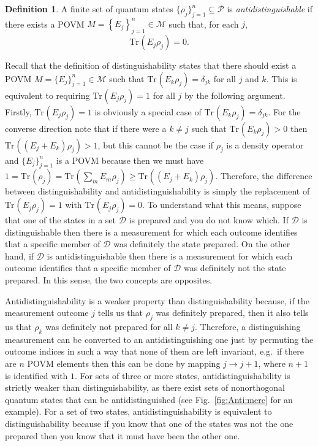 \documentclass[DIV=calc,fontsize=12pt]{scrartcl} %
\theoremstyle{definition}
\newtheorem{definition}{Definition}[section]
\theoremstyle{plain}
\newcommand{\Tr}[2][]{\ensuremath{\text{Tr}_{#1} \left ( #2 \right )}}
\begin{document}
\begin{definition}
A finite set of quantum states $\{\rho_j\}_{j=1}^n \subseteq
\mathcal{P}$ is \emph{antidistinguishable} if there exists a POVM $M
= \left \{ E_j \right \}_{j=1}^n \in \mathcal{M}$ such that, for
each $j$,
\begin{equation}
\Tr{E_j \rho_j} = 0.
\end{equation}
\end{definition}

Recall that the definition of distinguishability states that there
should exist a POVM $M = \{E_j\}_{j=1}^n \in \mathcal{M}$ such that
$\Tr{E_k\rho_j} = \delta_{jk}$ for all $j$ and $k$.  This is
equivalent to requiring $\Tr{E_j \rho_j} = 1$ for all $j$ by the
following argument.  Firstly, $\Tr{E_j\rho_j} = 1$ is obviously a
special case of $\Tr{E_k \rho_j} = \delta_{jk}$.  For the converse
direction note that if there were a $k \neq j$ such that $\Tr{E_k
\rho_j} > 0$ then $\Tr{\left ( E_j + E_k \right ) \rho_j} > 1$, but
this cannot be the case if $\rho_j$ is a density operator and
$\{E_j\}_{j=1}^n$ is a POVM because then we must have $1 = \Tr{\rho_j}
= \Tr{\sum_m E_m \rho_j} \geq \Tr{\left ( E_j + E_k \right ) \rho_j}$.
Therefore, the difference between distinguishability and
antidistinguishability is simply the replacement of $\Tr{E_j \rho_j} =
1$ with $\Tr{E_j \rho_j} = 0$.  To understand what this means, suppose
that one of the states in a set $\mathcal{D}$ is prepared and you do
not know which.  If $\mathcal{D}$ is distinguishable then there is a
measurement for which each outcome identifies that a specific member
of $\mathcal{D}$ was definitely the state prepared.  On the other
hand, if $\mathcal{D}$ is antidistinguishable then there is a
measurement for which each outcome identifies that a specific member
of $\mathcal{D}$ was definitely not the state prepared.  In this
sense, the two concepts are opposites.

Antidistinguishability is a weaker property than distinguishability
because, if the measurement outcome $j$ tells us that $\rho_j$ was
definitely prepared, then it also tells us that $\rho_k$ was
definitely not prepared for all $k \neq j$.  Therefore, a
distinguishing measurement can be converted to an antidistinguishing
one just by permuting the outcome indices in such a way that none of
them are left invariant, e.g.\ if there are $n$ POVM elements then
this can be done by mapping $j \rightarrow j+1$, where $n+1$ is
identified with $1$.  For sets of three or more states,
antidistinguishability is strictly weaker than distinguishability, as
there exist sets of nonorthogonal quantum states that can be
antidistinguished (see Fig.~\ref{fig:Anti:merc} for an example).  For
a set of two states, antidistinguishability is equivalent to
distinguishability because if you know that one of the states was not
the one prepared then you know that it must have been the other one.
\end{document}
